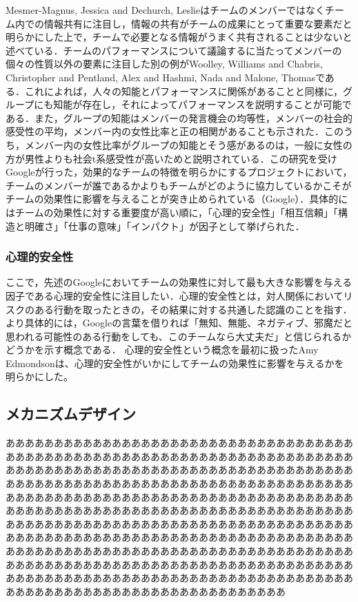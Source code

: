 \documentclass[a4paper, 11pt]{jsarticle}
\begin{document}
Mesmer-Magnus, Jessica and Dechurch, Leslie\cite{Mesmer}はチームのメンバーではなくチーム内での情報共有に注目し，情報の共有がチームの成果にとって重要な要素だと明らかにした上で，チームで必要となる情報がうまく共有されることは少ないと述べている．チームのパフォーマンスについて議論するに当たってメンバーの個々の性質以外の要素に注目した別の例がWoolley, Williams and Chabris, Christopher and Pentland, Alex and Hashmi, Nada and Malone, Thomas\cite{Woolley}である．これによれば，人々の知能とパフォーマンスに関係があることと同様に，グループにも知能が存在し，それによってパフォーマンスを説明することが可能である．また，グループの知能はメンバーの発言機会の均等性，メンバーの社会的感受性の平均，メンバー内の女性比率と正の相関があることも示された．このうち，メンバー内の女性比率がグループの知能とそう感があるのは，一般に女性の方が男性よりも社会t系感受性が高いためと説明されている．この研究を受けGoogleが行った，効果的なチームの特徴を明らかにするプロジェクトにおいて，チームのメンバーが誰であるかよりもチームがどのように協力しているかこそがチームの効果性に影響を与えることが突き止められている（Google\cite{Google}）．具体的にはチームの効果性に対する重要度が高い順に，「心理的安全性」「相互信頼」「構造と明確さ」「仕事の意味」「インパクト」が因子として挙げられた．
\subsubsection{心理的安全性}
ここで，先述のGoogle\cite{Google}においてチームの効果性に対して最も大きな影響を与える因子である心理的安全性に注目したい．心理的安全性とは，対人関係においてリスクのある行動を取ったときの，その結果に対する共通した認識のことを指す．より具体的には，Google\cite{Google}の言葉を借りれば「無知、無能、ネガティブ、邪魔だと思われる可能性のある行動をしても、このチームなら大丈夫だ」と信じられるかどうかを示す概念である．
心理的安全性という概念を最初に扱ったAmy Edmondson\cite{Edmondson}は、心理的安全性がいかにしてチームの効果性に影響を与えるかを明らかにした。
\subsection{メカニズムデザイン}
あああああああああああああああああああああああああああああああああああああああああああああああああああああああああああああああああああああああああああああああああああああああああああああああああああああああああああああああああああああああああああああああああああああああああああああああああああああああああああああああああああああああああああああああああああああああああああああああああああああああああああああああああああああああああああああああああああああああああああああああああああああああああああああああああああああああああああああああああああああああああああああああああああああああああああああああああああああああああああああああああああああああああああああああああああああああああああああああああああああああああああああああああああああああああああああああああああああああああああああああああああああああああああああああああああああああああ
\end{document}
